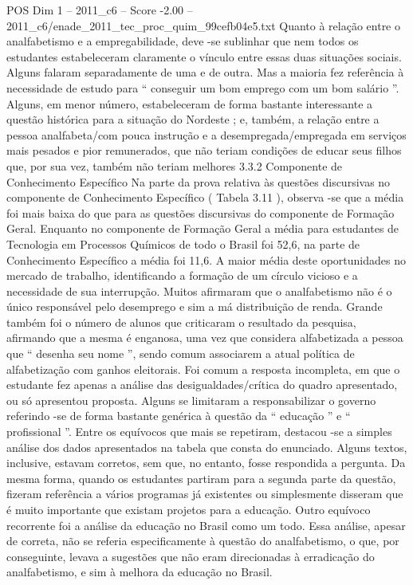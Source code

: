 \begin{textsample}{POS Dim 1 – 2011\_c6 – Score -2.00 – 2011\_c6/enade\_2011\_tec\_proc\_quim\_99cefb04e5.txt}
Quanto à relação entre o analfabetismo e a empregabilidade, deve -se sublinhar que nem todos os estudantes estabeleceram claramente o vínculo entre essas duas situações sociais.
Alguns falaram separadamente de uma e de outra.
Mas a maioria fez referência à necessidade de estudo para “ conseguir um bom emprego com um bom salário ”.
Alguns, em menor número, estabeleceram de forma bastante interessante a questão histórica para a situação do Nordeste ; e, também, a relação entre a pessoa analfabeta/com pouca instrução e a desempregada/empregada em serviços mais pesados e pior remunerados, que não teriam condições de educar seus filhos que, por sua vez, também não teriam melhores 3.3.2 Componente de Conhecimento Específico Na parte da prova relativa às questões discursivas no componente de Conhecimento Específico ( Tabela 3.11 ), observa -se que a média foi mais baixa do que para as questões discursivas do componente de Formação Geral.
Enquanto no componente de Formação Geral a média para estudantes de Tecnologia em Processos Químicos de todo o Brasil foi 52,6, na parte de Conhecimento Específico a média foi 11,6.
A maior média deste oportunidades no mercado de trabalho, identificando a formação de um círculo vicioso e a necessidade de sua interrupção.
Muitos afirmaram que o analfabetismo não é o único responsável pelo desemprego e sim a má distribuição de renda.
Grande também foi o número de alunos que criticaram o resultado da pesquisa, afirmando que a mesma é enganosa, uma vez que considera alfabetizada a pessoa que “ desenha seu nome ”, sendo comum associarem a atual política de alfabetização com ganhos eleitorais.
Foi comum a resposta incompleta, em que o estudante fez apenas a análise das desigualdades/crítica do quadro apresentado, ou só apresentou proposta.
Alguns se limitaram a responsabilizar o governo referindo -se de forma bastante genérica à questão da “ educação ” e “ profissional ”.
Entre os equívocos que mais se repetiram, destacou -se a simples análise dos dados apresentados na tabela que consta do enunciado.
Alguns textos, inclusive, estavam corretos, sem que, no entanto, fosse respondida a pergunta.
Da mesma forma, quando os estudantes partiram para a segunda parte da questão, fizeram referência a vários programas já existentes ou simplesmente disseram que é muito importante que existam projetos para a educação.
Outro equívoco recorrente foi a análise da educação no Brasil como um todo.
Essa análise, apesar de correta, não se referia especificamente à questão do analfabetismo, o que, por conseguinte, levava a sugestões que não eram direcionadas à erradicação do analfabetismo, e sim à melhora da educação no Brasil.

\end{textsample}

